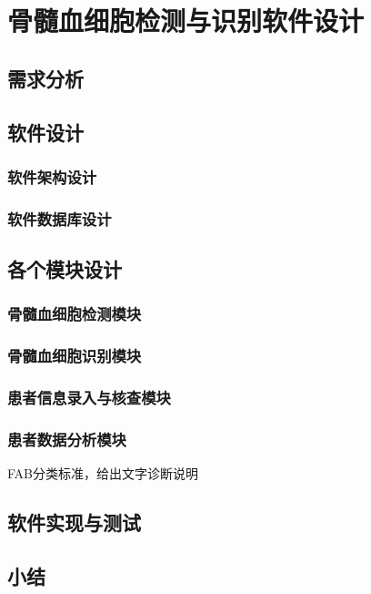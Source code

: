 \chapter{骨髓血细胞检测与识别软件设计}
\section{需求分析}
\section{软件设计}

\subsection{软件架构设计}
\subsection{软件数据库设计}

\section{各个模块设计}
\subsection{骨髓血细胞检测模块}
\subsection{骨髓血细胞识别模块}
\subsection{患者信息录入与核查模块}
\subsection{患者数据分析模块}
FAB分类标准，给出文字诊断说明

\section{软件实现与测试}
\section{小结}